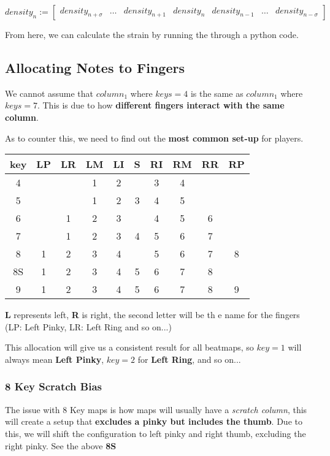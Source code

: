 $$
density_n :=
\begin{bmatrix}
	density_{n+\sigma} & \dots & density_{n+1} & density_{n} & density_{n-1} & \dots & density_{n-\sigma} 
\end{bmatrix}
$$ 

From here, we can calculate the strain by running the through a python code.
\subsection{Allocating Notes to Fingers}

We cannot assume that $column_1$ where $keys = 4$ is the same as $column_1$ where $keys = 7$. This is due to how \textbf{different fingers interact with the same column}.

As to counter this, we need to find out the \textbf{most common set-up} for players.

\begin{center}
	\begin{tabular}{|c|c|c|c|c|c|c|c|c|c|} 
	\hline
	key & LP & LR & LM & LI & S  & RI & RM & RR & RP\\
	\hline
	4   & {} & {} & 1  & 2  & {} & 3  & 4  & {} & {}\\
	5   & {} & {} & 1  & 2  & 3  & 4  & 5  & {} & {}\\
	6   & {} & 1  & 2  & 3  & {} & 4  & 5  & 6  & {}\\
	7   & {} & 1  & 2  & 3  & 4  & 5  & 6  & 7  & {}\\
	8   & 1  & 2  & 3  & 4  & {} & 5  & 6  & 7  & 8\\
	8S  & 1  & 2  & 3  & 4  & 5  & 6  & 7  & 8  & {}\\
	9   & 1  & 2  & 3  & 4  & 5  & 6  & 7  & 8  & 9\\
	\hline
\end{tabular}
\end{center}

\textbf{L} represents left, \textbf{R} is right, the second letter will be th	e name for the fingers (LP: Left Pinky, LR: Left Ring and so on...)

This allocation will give us a consistent result for all beatmaps, so $key=1$ will always mean \textbf{Left Pinky}, $key=2$ for \textbf{Left Ring}, and so on...

\subsubsection{8 Key Scratch Bias}
The issue with 8 Key maps is how maps will usually have a \textit{scratch column}, this will create a setup that \textbf{excludes a pinky but includes the thumb}. Due to this, we will shift the configuration to left pinky and right thumb, excluding the right pinky. See the above \textbf{8S}

